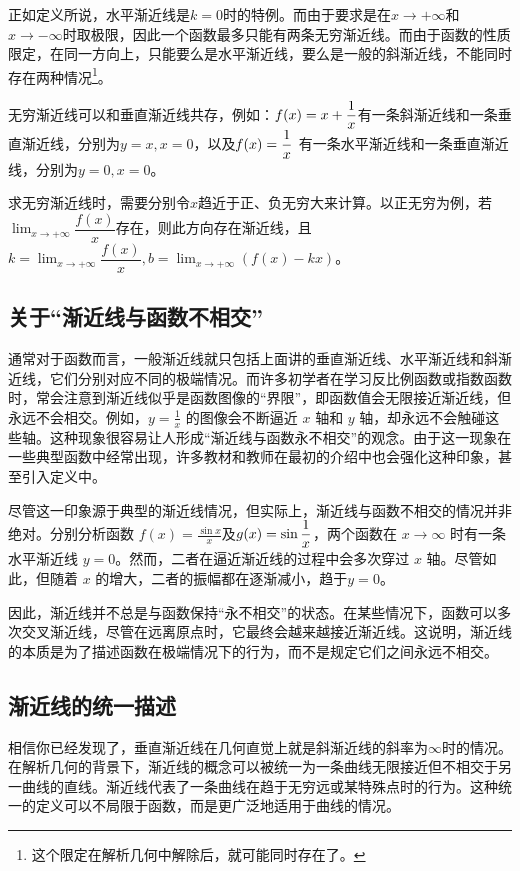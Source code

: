 正如定义所说，水平渐近线是$k=0$时的特例。而由于要求是在$x\to +\infty$和$x\to -\infty$时取极限，因此一个函数最多只能有两条无穷渐近线。而由于函数的性质限定，在同一方向上，只能要么是水平渐近线，要么是一般的斜渐近线，不能同时存在两种情况\footnote{这个限定在解析几何中解除后，就可能同时存在了。}。

无穷渐近线可以和垂直渐近线共存，例如：$\displaystyle f(x)=x+{1\over x}$有一条斜渐近线和一条垂直渐近线，分别为$y=x,x=0$，以及$\displaystyle f(x)={1\over x}$ 有一条水平渐近线和一条垂直渐近线，分别为$y=0,x=0$。

求无穷渐近线时，需要分别令$x$趋近于正、负无穷大来计算。以正无穷为例，若$\displaystyle \lim_{x \to +\infty} \dfrac{f(x)}{x}$存在，则此方向存在渐近线，且$\displaystyle k=\lim_{x \to +\infty} \dfrac{f(x)}{x},b = \lim_{x \to +\infty}\left(f(x) - kx\right)$。

\subsection{关于“渐近线与函数不相交”}

通常对于函数而言，一般渐近线就只包括上面讲的垂直渐近线、水平渐近线和斜渐近线，它们分别对应不同的极端情况。而许多初学者在学习反比例函数或指数函数时，常会注意到渐近线似乎是函数图像的“界限”，即函数值会无限接近渐近线，但永远不会相交。例如，$\displaystyle y = \frac{1}{x}$ 的图像会不断逼近 $x$ 轴和 $y$ 轴，却永远不会触碰这些轴。这种现象很容易让人形成“渐近线与函数永不相交”的观念。由于这一现象在一些典型函数中经常出现，许多教材和教师在最初的介绍中也会强化这种印象，甚至引入定义中。

尽管这一印象源于典型的渐近线情况，但实际上，渐近线与函数不相交的情况并非绝对。分别分析函数 $\displaystyle f(x) = \frac{\sin x}{x}$及$\displaystyle g(x)=\sin {1\over x}$，两个函数在 $x \to \infty$ 时有一条水平渐近线 $y = 0$。然而，二者在逼近渐近线的过程中会多次穿过 $x$ 轴。尽管如此，但随着 $x$ 的增大，二者的振幅都在逐渐减小，趋于$y = 0$。


因此，渐近线并不总是与函数保持“永不相交”的状态。在某些情况下，函数可以多次交叉渐近线，尽管在远离原点时，它最终会越来越接近渐近线。这说明，渐近线的本质是为了描述函数在极端情况下的行为，而不是规定它们之间永远不相交。

\subsection{渐近线的统一描述}

相信你已经发现了，垂直渐近线在几何直觉上就是斜渐近线的斜率为$\infty$时的情况。在解析几何的背景下，渐近线的概念可以被统一为一条曲线无限接近但不相交于另一曲线的直线。渐近线代表了一条曲线在趋于无穷远或某特殊点时的行为。这种统一的定义可以不局限于函数，而是更广泛地适用于曲线的情况。

